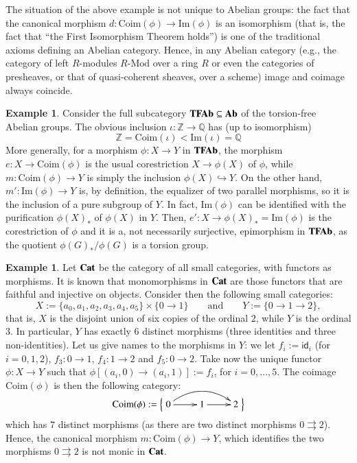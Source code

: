 \documentclass[12pt]{article}
\theoremstyle{definition}
\newtheorem{example}[lemma]{Example}
\def\Z{\mathbb Z}
\def\Q{\mathbb Q}
\def\Coim{\mathrm{Coim}}
\def\Im{\mathrm{Im}}
\newcommand{\Ab}{\textbf{\textup{Ab}}}
\newcommand{\TFA}{\textbf{\textup{TFAb}}}
\newcommand{\Cat}{\textbf{\textup{Cat}}}
\numberwithin{equation}{section}
\newcommand{\id}[1]{\mathsf{id}_{#1}}
\begin{document}

The situation of the above example is not unique to Abelian groups: the fact that the canonical morphism $d\colon \Coim(\phi)\to\Im(\phi)$ is an isomorphism (that is, the fact that ``the First Isomorphism Theorem holds'') is one of the traditional axioms defining an Abelian category. Hence, in any Abelian category (e.g., the category of left $R$-modules $R\text{-}\mathrm{Mod}$ over a ring $R$ or even the categories of presheaves, or that of quasi-coherent sheaves, over a scheme) image and coimage always coincide.


\begin{example}
Consider the full subcategory $\TFA\subseteq \Ab$ of the torsion-free Abelian groups. The obvious inclusion $\iota\colon \Z \to \Q$ has (up to isomorphism) \[\Z = \Coim(\iota) < \Im(\iota) =\Q\]
 More generally, for a morphism $\phi\colon X\to Y$ in $\TFA$, the morphism $e\colon X \to \Coim(\phi)$ is the usual corestriction $X \to \phi(X)$ of $\phi$, while $m\colon \Coim(\phi)\to Y$ is simply the inclusion $\phi(X) \hookrightarrow Y$. On the other hand, $m' \colon \Im(\phi) \to Y$ is, by definition, the equalizer of two parallel morphisms, so it is the inclusion of a pure subgroup of $Y$. In fact, $\Im(\phi)$ can be identified with the purification $\phi(X)_*$ of $\phi(X)$ in $Y$. Then, $e'\colon X \to \phi(X)_* = \Im(\phi)$
is the corestriction of $\phi$ and it is a, not necessarily surjective, epimorphism in $\TFA$, as the quotient $\phi(G)_*/\phi(G)$ is a torsion group. 
\end{example}

\begin{example}\cite[Proposition~1.8]{MS}
Let $\Cat$ be the category of all small categories, with functors as morphisms. It is known that monomorphisms in $\Cat$ are those functors that are faithful and injective on objects. Consider then the following small categories:
\[
X:=\{a_0,a_1,a_2,a_3,a_4,a_5\}\times\{0\to 1\}\qquad\text{and}\qquad Y:=\{0\to 1\to 2\},
\]
that is, $X$ is the disjoint union of six copies of the ordinal $2$, while $Y$ is the ordinal $3$. In particular, $Y$ has exactly $6$ distinct morphisms (three identities and three non-identities). Let us give names to the morphisms in $Y$: we let $f_i:=\id i$ (for $i=0,1,2$), $f_3\colon 0\to 1$, $f_4\colon 1\to 2$ and $f_5\colon 0\to 2$. Take now the unique functor $\phi\colon X\to Y$ such that $\phi[(a_i,0)\to (a_i,1)]:=f_i$, for $i=0,\dots,5$. The coimage $\Coim(\phi)$ is then the following category:
\[
\Coim(\phi):=\left\{\xymatrix{0\ar[r]\ar@/_-0.5cm/[rr]&1\ar[r]&2}\right\}
\]
which has $7$ distinct morphisms (as there are two distinct morphisms $0\rightrightarrows 2$). Hence, the canonical morphism $m\colon \Coim(\phi)\to Y$, which identifies the two morphisms $0\rightrightarrows 2$ is not monic in $\Cat$.
\end{example}
\end{document}
